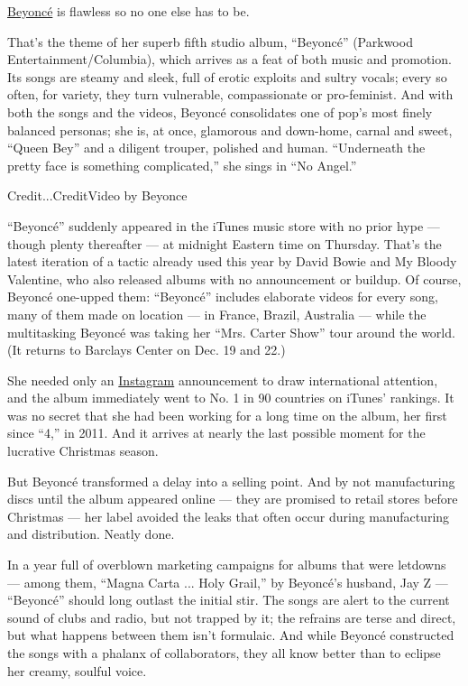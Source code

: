 \href{http://beyonce.com/}{Beyoncé} is flawless so no one else has to
be.

That's the theme of her superb fifth studio album, ``Beyoncé'' (Parkwood
Entertainment/Columbia), which arrives as a feat of both music and
promotion. Its songs are steamy and sleek, full of erotic exploits and
sultry vocals; every so often, for variety, they turn vulnerable,
compassionate or pro-feminist. And with both the songs and the videos,
Beyoncé consolidates one of pop's most finely balanced personas; she is,
at once, glamorous and down-home, carnal and sweet, ``Queen Bey'' and a
diligent trouper, polished and human. ``Underneath the pretty face is
something complicated,'' she sings in ``No Angel.''

Credit...CreditVideo by Beyonce

``Beyoncé'' suddenly appeared in the iTunes music store with no prior
hype --- though plenty thereafter --- at midnight Eastern time on
Thursday. That's the latest iteration of a tactic already used this year
by David Bowie and My Bloody Valentine, who also released albums with no
announcement or buildup. Of course, Beyoncé one-upped them: ``Beyoncé''
includes elaborate videos for every song, many of them made on location
--- in France, Brazil, Australia --- while the multitasking Beyoncé was
taking her ``Mrs. Carter Show'' tour around the world. (It returns to
Barclays Center on Dec. 19 and 22.)

She needed only an \href{http://instagram.com/p/h2YFO6Pw1d/}{Instagram}
announcement to draw international attention, and the album immediately
went to No. 1 in 90 countries on iTunes' rankings. It was no secret that
she had been working for a long time on the album, her first since
``4,'' in 2011. And it arrives at nearly the last possible moment for
the lucrative Christmas season.

But Beyoncé transformed a delay into a selling point. And by not
manufacturing discs until the album appeared online --- they are
promised to retail stores before Christmas --- her label avoided the
leaks that often occur during manufacturing and distribution. Neatly
done.

In a year full of overblown marketing campaigns for albums that were
letdowns --- among them, ``Magna Carta ... Holy Grail,'' by Beyoncé's
husband, Jay Z --- ``Beyoncé'' should long outlast the initial stir. The
songs are alert to the current sound of clubs and radio, but not trapped
by it; the refrains are terse and direct, but what happens between them
isn't formulaic. And while Beyoncé constructed the songs with a phalanx
of collaborators, they all know better than to eclipse her creamy,
soulful voice.

